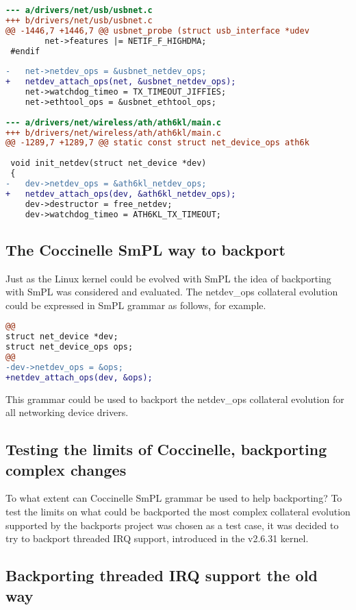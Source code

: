 \documentclass[a4paper,10pt]{article}
\begin{document}
\begin{lstlisting}[language=diff]
--- a/drivers/net/usb/usbnet.c
+++ b/drivers/net/usb/usbnet.c
@@ -1446,7 +1446,7 @@ usbnet_probe (struct usb_interface *udev
 		net->features |= NETIF_F_HIGHDMA;
 #endif
 
-	net->netdev_ops = &usbnet_netdev_ops;
+	netdev_attach_ops(net, &usbnet_netdev_ops);
 	net->watchdog_timeo = TX_TIMEOUT_JIFFIES;
 	net->ethtool_ops = &usbnet_ethtool_ops;
 
--- a/drivers/net/wireless/ath/ath6kl/main.c
+++ b/drivers/net/wireless/ath/ath6kl/main.c
@@ -1289,7 +1289,7 @@ static const struct net_device_ops ath6k
 
 void init_netdev(struct net_device *dev)
 {
-	dev->netdev_ops = &ath6kl_netdev_ops;
+	netdev_attach_ops(dev, &ath6kl_netdev_ops);
 	dev->destructor = free_netdev;
 	dev->watchdog_timeo = ATH6KL_TX_TIMEOUT;
\end{lstlisting}
 

\subsection{The Coccinelle SmPL way to backport}

Just as the Linux kernel could be evolved with SmPL the idea of backporting
with SmPL was considered and evaluated. The netdev\_ops collateral evolution
could be expressed in SmPL grammar as follows, for example.

\begin{lstlisting}[language=diff]
@@
struct net_device *dev;
struct net_device_ops ops;
@@
-dev->netdev_ops = &ops;
+netdev_attach_ops(dev, &ops);
\end{lstlisting}

This grammar could be used to backport the netdev\_ops collateral evolution
for all networking device drivers.

\subsection{Testing the limits of Coccinelle, backporting complex changes}

To what extent can Coccinelle SmPL grammar be used to help backporting?
To test the limits on what could be backported the most complex collateral
evolution supported by the backports project was chosen as a test case,
it was decided to try to backport threaded IRQ support, introduced in the
v2.6.31 kernel.

\subsection{Backporting threaded IRQ support the old way}
\end{document}
